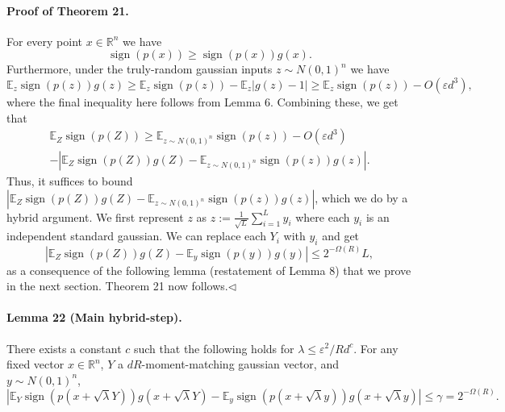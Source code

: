 \documentclass[10pt,a4paper]{article}
\begin{document}
\paragraph{Proof of Theorem 21.} For every point $x\in\mathbb R^n$ we have
\[\operatorname{sign}(p(x))\geq\operatorname{sign}(p(x))g(x).\]
Furthermore, under the truly-random gaussian inputs $z\sim N(0,1)^n$ we have
\[\mathbb E_z\operatorname{sign}(p(z))g(z)\geq\mathbb E_z\operatorname{sign}(p(z))-\mathbb E_z|g(z)-1|\geq\mathbb E_z\operatorname{sign}(p(z))-O(\varepsilon d^3),\]
where the final inequality here follows from Lemma 6. Combining these, we get that
\begin{multline*}
\mathbb E_Z\operatorname{sign}(p(Z))\geq\mathbb E_{z\sim N(0,1)^n}\operatorname{sign}(p(z))-O(\varepsilon d^3)\\
-\left|\mathbb E_Z\operatorname{sign}(p(Z))g(Z)-\mathbb E_{z\sim N(0,1)^n}\operatorname{sign}(p(z))g(z)\right|.
\end{multline*}
Thus, it suffices to bound $|\mathbb E_Z\operatorname{sign}(p(Z))g(Z)-\mathbb E_{z\sim N(0,1)^n}\operatorname{sign}(p(z))g(z)|$, which we do by a hybrid argument. We first represent $z$ as $z:=\frac1{\sqrt L}\sum_{i=1}^Ly_i$ where each $y_i$ is an independent standard gaussian. We can replace each $Y_i$ with $y_i$ and get
\[|\mathbb E_Z\operatorname{sign}(p(Z))g(Z)-\mathbb E_y\operatorname{sign}(p(y))g(y)|\leq2^{-\Omega(R)}L,\]
as a consequence of the following lemma (restatement of Lemma 8) that we prove in the next section. Theorem 21 now follows.\hfill$\triangleleft$
\paragraph{Lemma 22 (Main hybrid-step).} There exists a constant $c$ such that the following holds for $\lambda\leq\varepsilon^2/Rd^c$. For any fixed vector $x\in\mathbb R^n$, $Y$ a $dR$-moment-matching gaussian vector, and $y\sim N(0,1)^n$,
\[|\mathbb E_Y\operatorname{sign}(p(x+\sqrt\lambda Y))g(x+\sqrt\lambda Y)-\mathbb E_y\operatorname{sign}(p(x+\sqrt\lambda y))g(x+\sqrt\lambda y)|\leq\gamma=2^{-\Omega(R)}.\]
\end{document}
